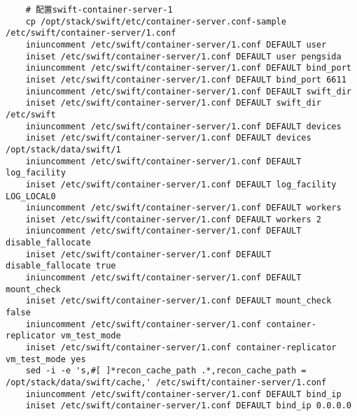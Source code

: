 \documentclass[a4paper,left=1.5cm,right=1.5cm,11pt]{article}
\begin{document}
\begin{lstlisting}
	# 配置swift-container-server-1
	cp /opt/stack/swift/etc/container-server.conf-sample /etc/swift/container-server/1.conf
	iniuncomment /etc/swift/container-server/1.conf DEFAULT user
    iniset /etc/swift/container-server/1.conf DEFAULT user pengsida
    iniuncomment /etc/swift/container-server/1.conf DEFAULT bind_port
    iniset /etc/swift/container-server/1.conf DEFAULT bind_port 6611
    iniuncomment /etc/swift/container-server/1.conf DEFAULT swift_dir
    iniset /etc/swift/container-server/1.conf DEFAULT swift_dir /etc/swift
    iniuncomment /etc/swift/container-server/1.conf DEFAULT devices
    iniset /etc/swift/container-server/1.conf DEFAULT devices /opt/stack/data/swift/1
    iniuncomment /etc/swift/container-server/1.conf DEFAULT log_facility
    iniset /etc/swift/container-server/1.conf DEFAULT log_facility LOG_LOCAL0
    iniuncomment /etc/swift/container-server/1.conf DEFAULT workers
    iniset /etc/swift/container-server/1.conf DEFAULT workers 2
    iniuncomment /etc/swift/container-server/1.conf DEFAULT disable_fallocate
    iniset /etc/swift/container-server/1.conf DEFAULT disable_fallocate true
    iniuncomment /etc/swift/container-server/1.conf DEFAULT mount_check
    iniset /etc/swift/container-server/1.conf DEFAULT mount_check false
    iniuncomment /etc/swift/container-server/1.conf container-replicator vm_test_mode
    iniset /etc/swift/container-server/1.conf container-replicator vm_test_mode yes
    sed -i -e 's,#[ ]*recon_cache_path .*,recon_cache_path = /opt/stack/data/swift/cache,' /etc/swift/container-server/1.conf
    iniuncomment /etc/swift/container-server/1.conf DEFAULT bind_ip
    iniset /etc/swift/container-server/1.conf DEFAULT bind_ip 0.0.0.0


\end{lstlisting}
\end{document}
